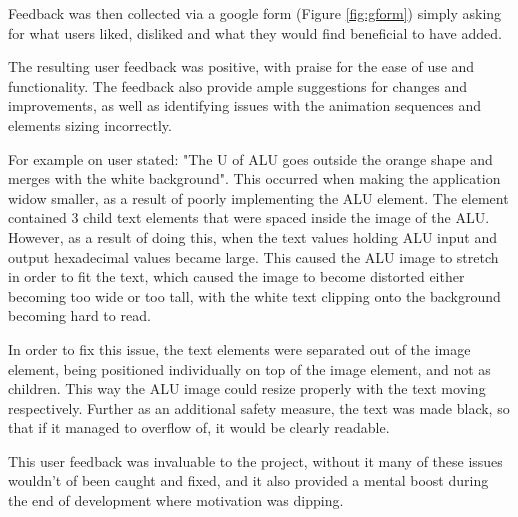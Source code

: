 Feedback was then collected via a google form (Figure \ref{fig:gform}) simply asking for what users liked, disliked and what they would find beneficial to have added.

The resulting user feedback was positive, with praise for the ease of use and functionality. The feedback also provide ample suggestions for changes and improvements, as well as identifying issues with the animation sequences and elements sizing incorrectly.

For example on user stated: "The U of ALU goes outside the orange shape and merges with the white background". This occurred when making the application widow smaller, as a result of poorly implementing the \ac{ALU} element. The element contained 3 child text elements that were spaced inside the image of the \ac{ALU}. However, as a result of doing this, when the text values holding \ac{ALU} input and output hexadecimal values became large. This caused the \ac{ALU} image to stretch in order to fit the text, which caused the image to become distorted either becoming too wide or too tall, with the white text clipping onto the background becoming hard to read.

In order to fix this issue, the text elements were separated out of the image element, being positioned individually on top of the image element, and not as children. This way the \ac{ALU} image could resize properly with the text moving respectively. Further as an additional safety measure, the text was made black, so that if it managed to overflow of, it would be clearly readable.

This user feedback was invaluable to the project, without it many of these issues wouldn't of been caught and fixed, and it also provided a mental boost during the end of development where motivation was dipping.

